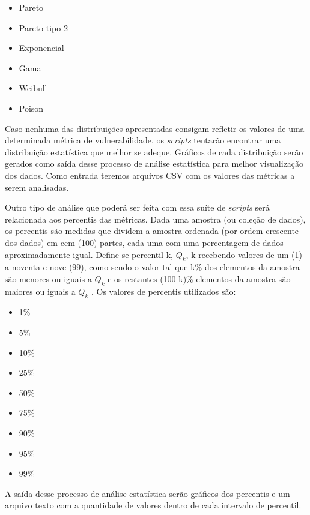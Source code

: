 \begin{itemize}
  \item Pareto
  \item Pareto tipo 2
  \item Exponencial
  \item Gama
  \item Weibull
  \item Poison
\end{itemize}

Caso nenhuma das distribuições apresentadas consigam refletir os valores de uma determinada métrica de vulnerabilidade, os
\textit{scripts} tentarão encontrar uma distribuição estatística que melhor se adeque. Gráficos de cada distribuição serão
gerados como saída desse processo de análise estatística para melhor visualização dos dados. Como entrada teremos arquivos
CSV com os valores das métricas a serem analisadas.

Outro tipo de análise que poderá ser feita com essa suíte de \textit{scripts} será relacionada aos percentis das métricas.
Dada uma amostra (ou coleção de dados), os percentis são medidas que dividem a amostra ordenada (por ordem crescente dos dados) 
em cem (100) partes, cada uma com uma percentagem de dados aproximadamente igual. Define-se percentil k, ${Q_k}$, 
k recebendo valores de um (1) a noventa e nove (99), como sendo o valor tal que k\% dos elementos da amostra são menores ou 
iguais a ${Q_k}$ e os restantes (100-k)\% elementos da amostra são maiores ou iguais a ${Q_k}$ \cite{martins2013}. Os valores
de percentis utilizados são: 

\begin{multicols}{3}
  \begin{itemize}
    \item 1\%
    \item 5\%
    \item 10\%
    \item 25\%
    \item 50\%
    \item 75\%
    \item 90\%
    \item 95\%
    \item 99\%
  \end{itemize}
\end{multicols}

A saída desse processo de análise estatística serão gráficos dos percentis e um arquivo texto com a quantidade de valores 
dentro de cada intervalo de percentil.

